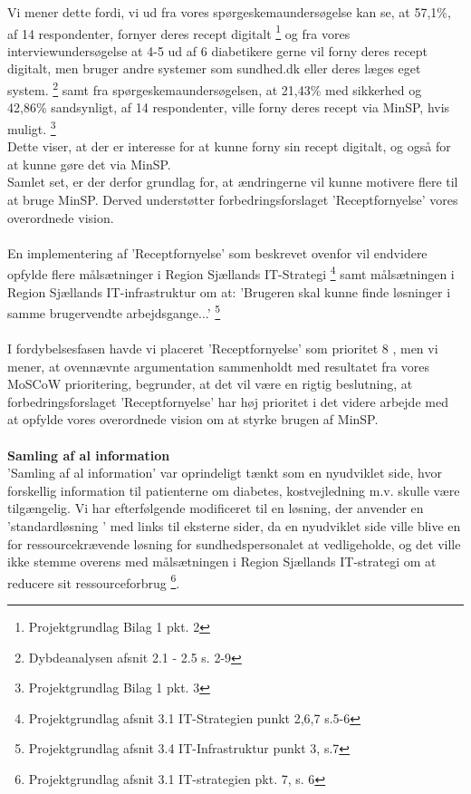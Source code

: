 Vi mener dette fordi, vi ud fra vores spørgeskemaundersøgelse kan se, at 57,1\%, af 14 respondenter, fornyer deres recept digitalt \footnote{Projektgrundlag Bilag 1 pkt. 2} og fra vores interviewundersøgelse at 4-5 ud af 6 diabetikere gerne vil forny deres recept digitalt, men bruger andre systemer som sundhed.dk eller deres læges eget system. \footnote{Dybdeanalysen afsnit 2.1 - 2.5 s. 2-9} samt fra spørgeskemaundersøgelsen, at 21,43\% med sikkerhed og 42,86\% sandsynligt, af 14 respondenter, ville forny deres recept via MinSP, hvis muligt. \footnote{Projektgrundlag Bilag 1 pkt. 3}  \\
Dette viser, at der er interesse for at kunne forny sin recept digitalt, og også for at kunne gøre det via MinSP.\\
Samlet set, er der derfor grundlag for, at ændringerne vil kunne motivere flere til at bruge MinSP. Derved understøtter forbedringsforslaget 'Receptfornyelse' vores overordnede vision.\\
\\
En implementering af 'Receptfornyelse' som beskrevet ovenfor vil endvidere opfylde flere målsætninger i Region Sjællands IT-Strategi \footnote{Projektgrundlag afsnit 3.1 IT-Strategien punkt 2,6,7 s.5-6} samt målsætningen i Region Sjællands IT-infrastruktur om at: 'Brugeren skal kunne finde løsninger i samme brugervendte arbejdsgange...' \footnote{Projektgrundlag afsnit 3.4 IT-Infrastruktur punkt 3, s.7}\\
\\
I fordybelsesfasen havde vi placeret 'Receptfornyelse' som prioritet 8%
, men vi mener, at ovennævnte argumentation sammenholdt med resultatet fra vores MoSCoW prioritering, begrunder, at det vil være en rigtig beslutning, at %
forbedringsforslaget 'Receptfornyelse' har høj prioritet i det videre arbejde med at opfylde vores overordnede vision om at styrke brugen af MinSP.\\\\
\textbf{Samling af al information}\\
'Samling af al information' var oprindeligt tænkt som en nyudviklet side, hvor forskellig information til patienterne om diabetes, kostvejledning m.v. skulle være tilgængelig. Vi har efterfølgende modificeret til en løsning, der anvender en ’standardløsning ’ med links til eksterne sider, da en nyudviklet side ville blive en for ressourcekrævende løsning for sundhedspersonalet at vedligeholde, og det ville ikke stemme overens med målsætningen i Region Sjællands IT-strategi om at reducere sit ressourceforbrug \footnote{Projektgrundlag afsnit 3.1 IT-strategien pkt. 7, s. 6}.\\
